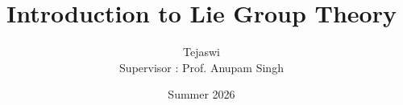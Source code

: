 \documentclass[a4paper,12pt]{report}
\title{\Huge\textbf{Introduction to Lie Group Theory}}
\author{Tejaswi\\ Supervisor : Prof. Anupam Singh}
\date{Summer 2026}
\theoremstyle{definition}
\theoremstyle{remark}
\begin{document}
  \noindent
  \maketitle


  \tableofcontents
  \newpage


  
  
  
  


  \nocite{baker, tapp}
  
  
\end{document}
